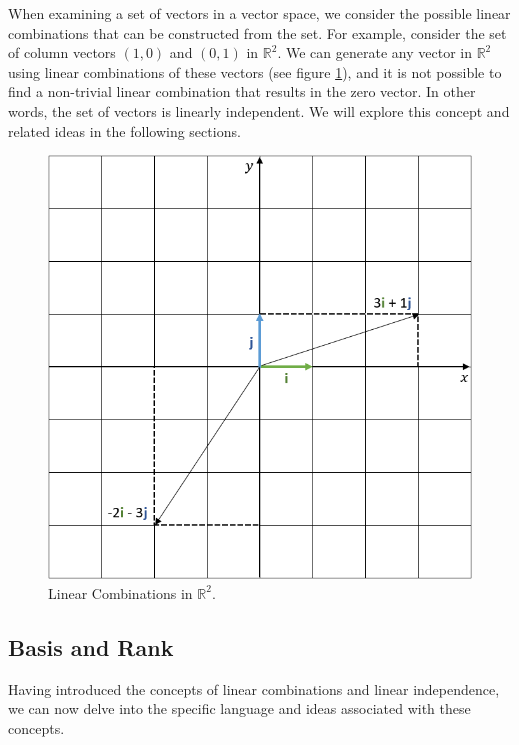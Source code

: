 \documentclass[12pt]{book}
\begin{document}
	When examining a set of vectors in a vector space, we consider the possible linear combinations that can be constructed from the set. For example, consider the set of column vectors $(1, 0)$ and $(0, 1)$ in $\mathbb{R}^2$. We can generate any vector in $\mathbb{R}^2$ using linear combinations of these vectors (see figure \ref{fig:linear_combinations}), and it is not possible to find a non-trivial linear combination that results in the zero vector. In other words, the set of vectors is linearly independent. We will explore this concept and related ideas in the following sections.
	
	\begin{figure}[h]
		\centering
		\includegraphics[scale=0.37]{linear_combinations.png}
		\caption{Linear Combinations in $\mathbb{R}^2$.}
		\label{fig:linear_combinations}
	\end{figure}
	
	\subsection{Basis and Rank}
	
	Having introduced the concepts of linear combinations and linear independence, we can now delve into the specific language and ideas associated with these concepts.
	
\end{document}

